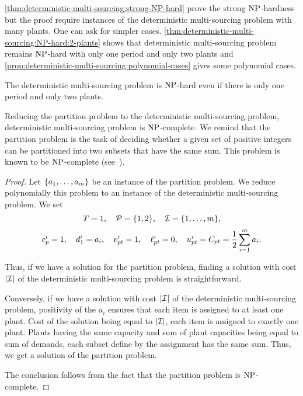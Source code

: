 \cref{thm:deterministic-multi-sourcing:strong-NP-hard} prove the strong $\operatorname{NP}$-hardness but the proof require instances of the deterministic multi-sourcing problem with many plants.
One can ask for simpler cases.
\cref{thm:deterministic-multi-sourcing:NP-hard:2-plants} shows that deterministic multi-sourcing problem remains $\operatorname{NP}$-hard with only one period and only two plants and \cref{prop:deterministic-multi-sourcing:polynomial-cases} gives some polynomial cases.


\begin{thm}\label{thm:deterministic-multi-sourcing:NP-hard:2-plants}
The deterministic multi-sourcing problem is $\operatorname{NP}$-hard even if there is only one period and only two plants.
\end{thm}


Reducing the partition problem to the deterministic multi-sourcing problem, deterministic multi-sourcing problem is $\operatorname{NP}$-complete.
We remind that the partition problem is the task of deciding whether a given set of positive integers can be partitioned into two subsets that have the same sum.
This problem is known to be $\operatorname{NP}$-complete (see~\cite{Garey1979}).


\begin{proof}
Let $\crbracket{a_1,\ldots,a_m}$ be an instance of the partition problem.
We reduce polynomially this problem to an instance of the deterministic multi-sourcing problem.
We set
$$
  \horizon=1
  ,\quad
  \plants=\crbracket{1,2}
  ,\quad
  \REF=\range[1]{m},
$$
$$
  c_p^i=1
  ,\quad
  d_1^i=a_i
  ,\quad
  v_{pt}^i=1
  ,\quad
  \ell_{pt}^i=0
  ,\quad
  u_{pt}^i=C_{pt}=\frac{1}{2}\sum_{i=1}^{m}a_i.
$$

Thus, if we have a solution for the partition problem, finding a solution with cost $\card{\REF}$ of the deterministic multi-sourcing problem is straightforward.

Conversely, if we have a solution with cost $\card{\REF}$ of the deterministic multi-sourcing problem, positivity of the $a_i$ ensures that each item is assigned to at least one plant.
Cost of the solution being equal to $\card{\REF}$, each item is assigned to exactly one plant.
Plants having the same capacity and sum of plant capacities being equal to sum of demands, each subset define by the assignment has the same sum.
Thus, we get a solution of the partition problem.

The conclusion follows from the fact that the partition problem is $\operatorname{NP}$-complete.
\end{proof}


